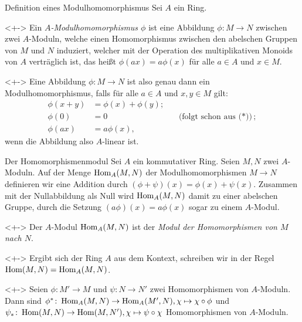 \begin{frame}{Definition eines Modulhomomorphismus}
	Sei \(A\) ein Ring.
	\begin{definition}<+->
		Ein \emph{\(A\)-Modulhomomorphismus \(\phi\)} ist eine Abbildung \(\phi\colon
		M \to N\) zwischen zwei \(A\)-Moduln, welche einen Homomorphismus zwischen
		den abelschen Gruppen von \(M\) und \(N\) induziert, welcher mit der Operation
		des multiplikativen Monoids von \(A\) verträglich ist, das heißt
		\(\phi(a x) = a \phi(x)\) für alle \(a \in A\) und \(x \in M\).
	\end{definition}
	\begin{visibleenv}<+->
		Eine Abbildung \(\phi\colon M \to N\) ist also genau dann ein 
		Modulhomomorphismus, falls für alle \(a \in A\) und \(x, y \in M\) gilt:
		\begin{align*}
			\phi(x + y) & = \phi(x) + \phi(y); \tag{$*$} \\
			\phi(0) & = 0 && \text{(folgt schon aus ($*$))}; \\
			\phi(a x) & = a \phi(x),
		\end{align*}
		wenn die Abbildung also \(A\)-linear ist.
	\end{visibleenv}
\end{frame}

\begin{frame}{Der Homomorphismenmodul}
	Sei \(A\) ein kommutativer Ring. Seien \(M, N\) zwei \(A\)-Moduln.
	Auf der Menge \(\operatorname{Hom}_A(M, N)\) der Modulhomomorphismen \(M \to N\) definieren wir
	eine Addition durch \((\phi + \psi)(x) = \phi(x) + \psi(x)\). Zusammen mit der
	Nullabbildung als Null wird \(\operatorname{Hom}_A(M, N)\) damit zu einer abelschen Gruppe,
	durch die Setzung \((a \phi)(x) = a \phi(x)\) sogar zu einem \(A\)-Modul.
	\begin{definition}<+->
		Der \(A\)-Modul \(\operatorname{Hom}_A(M, N)\) ist der \emph{Modul der Homomorphismen von
		\(M\) nach \(N\)}.
	\end{definition}
	\begin{visibleenv}<+->
		Ergibt sich der Ring \(A\) aus dem Kontext, schreiben wir in der Regel
		\(\operatorname{Hom}(M, N) = \operatorname{Hom}_A(M, N)\).
	\end{visibleenv}
	\begin{example}<+->
		Seien \(\phi\colon M' \to M\) und \(\psi\colon N \to N'\) zwei Homomorphismen
		von \(A\)-Moduln. Dann sind
		\(\phi^*\colon \operatorname{Hom}_A(M, N) \to \operatorname{Hom}_A(M', N), \chi \mapsto \chi \circ \phi\)
		und
		\(\psi_*\colon \operatorname{Hom}(M, N) \to \operatorname{Hom}(M, N'), \chi \mapsto \psi \circ \chi\)
		Homomorphismen von \(A\)-Moduln.
	\end{example}
\end{frame}

